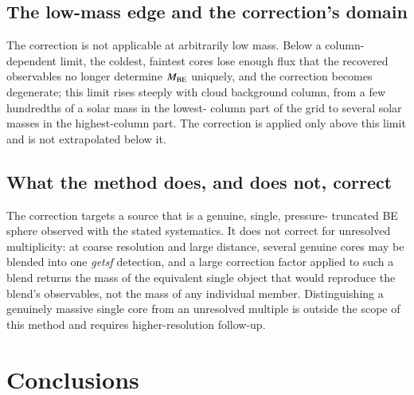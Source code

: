 \documentclass{aa}
\newcommand{\Mbe}{M_{\rm BE}}
\begin{document}
\subsection{The low-mass edge and the correction's domain}
\label{sec:lowmass}

The correction is not applicable at arbitrarily low mass. Below a
column-dependent limit, the coldest, faintest cores lose enough flux that
the recovered observables no longer determine $\Mbe$ uniquely, and
the correction becomes degenerate; this limit rises steeply with cloud
background column, from a few hundredths of a solar mass in the lowest-
column part of the grid to several solar masses in the highest-column part.
The correction is applied only above this limit and is not extrapolated
below it.

\subsection{What the method does, and does not, correct}
\label{sec:scope}

The correction targets a source that is a genuine, single, pressure-
truncated BE sphere observed with the stated systematics. It does not
correct for unresolved multiplicity: at coarse resolution and large
distance, several genuine cores may be blended into one \emph{getsf}
detection, and a large correction factor applied to such a blend returns the
mass of the equivalent single object that would reproduce the blend's
observables, not the mass of any individual member. Distinguishing a
genuinely massive single core from an unresolved multiple is outside the
scope of this method and requires higher-resolution follow-up.

\section{Conclusions}
\label{sec:conclusions}
\end{document}
